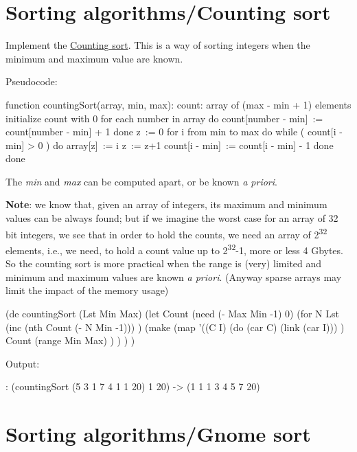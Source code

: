 \pagebreak{}
\section*{Sorting algorithms/Counting sort}

Implement the
\href{http://en.wikipedia.org/wiki/Counting\_sort}{Counting sort}.
This is a way of sorting integers when the minimum and maximum value
are known.

Pseudocode:

\begin{wideverbatim}
function countingSort(array, min, max):
    count: array of (max - min + 1) elements
    initialize count with 0
    for each number in array do
        count[number - min] := count[number - min] + 1
    done
    z := 0
    for i from min to max do
        while ( count[i - min] > 0 ) do
            array[z] := i
            z := z+1
            count[i - min] := count[i - min] - 1
        done
    done
\end{wideverbatim}

The \emph{min} and \emph{max} can be computed apart, or be known \emph{a
priori}.

\textbf{Note}: we know that, given an array of integers, its maximum and
minimum values can be always found; but if we imagine the worst case for
an array of 32 bit integers, we see that in order to hold the counts, we
need an array of 2\textsuperscript{32} elements, i.e., we need, to hold
a count value up to 2\textsuperscript{32}-1, more or less 4 Gbytes. So
the counting sort is more practical when the range is (very) limited and
minimum and maximum values are known \emph{a priori}. (Anyway sparse
arrays may limit the impact of the memory usage)


\begin{wideverbatim}

(de countingSort (Lst Min Max)
   (let Count (need (- Max Min -1) 0)
      (for N Lst
         (inc (nth Count (- N Min -1))) )
      (make
         (map
            '((C I)
               (do (car C) (link (car I))) )
            Count
            (range Min Max) ) ) ) )

Output:

: (countingSort (5 3 1 7 4 1 1 20) 1 20)
-> (1 1 1 3 4 5 7 20)

\end{wideverbatim}

\pagebreak{}
\section*{Sorting algorithms/Gnome sort}

